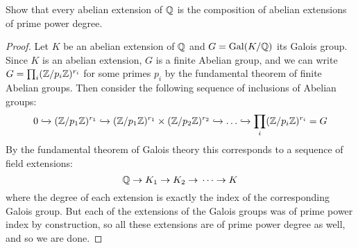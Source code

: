 \documentclass[11pt]{article}
\DeclareMathOperator{\Gal}{Gal}
\begin{document}
Show that every abelian extension of $\mathbb{Q}$ is the composition of abelian extensions of prime power degree.

\begin{proof}
  Let $K$ be an abelian extension of $\mathbb{Q}$ and $G = \Gal(K/\Q)$ its Galois group.
  Since $K$ is an abelian extension, $G$ is a finite Abelian group, and we can write $G = \prod_i (\mathbb{Z}/p_i\mathbb{Z})^{r_i}$ for some primes $p_i$ by the fundamental theorem of finite Abelian groups.
  Then consider the following sequence of inclusions of Abelian groups:
  \begin{equation*}
    0 \xhookrightarrow{} (\mathbb{Z}/p_1\mathbb{Z})^{r_1}
    \xhookrightarrow{} (\mathbb{Z}/p_1\mathbb{Z})^{r_1} \times (\mathbb{Z}/p_2\mathbb{Z})^{r_2}
    \xhookrightarrow{} \dots \xhookrightarrow{}
    \prod_i (\mathbb{Z}/p_i\mathbb{Z})^{r_i} = G    
  \end{equation*}
  By the fundamental theorem of Galois theory this corresponds to a sequence of field extensions:
  \begin{equation*}
    \mathbb{Q} \rightarrow{} K_1 \rightarrow{} K_2 \rightarrow{} \dots
    \rightarrow{} K
  \end{equation*}
  where the degree of each extension is exactly the index of the corresponding Galois group.
  But each of the extensions of the Galois groups was of prime power index by construction, so all these extensions are of prime power degree as well, and so we are done.
\end{proof} 
\end{document}
